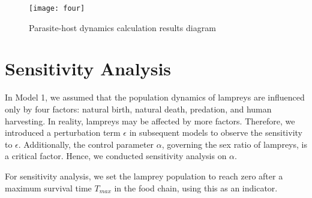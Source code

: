 \documentclass[CTeX = true]{mcmthesis}  %
\begin{document}
\begin{figure}[htbp]
       \centering    
   \texttt{[image: four]}
     \caption{Parasite-host dynamics calculation results diagram}
     \label{four}
\end{figure}

\section{Sensitivity Analysis}

In Model 1, we assumed that the population dynamics of lampreys are influenced only by four factors: natural birth, natural death, predation, and human harvesting. In reality, lampreys may be affected by more factors. Therefore, we introduced a perturbation term \(\epsilon\) in subsequent models to observe the sensitivity to \(\epsilon\). Additionally, the control parameter \(\alpha\), governing the sex ratio of lampreys, is a critical factor. Hence, we conducted sensitivity analysis on \(\alpha\).

For sensitivity analysis, we set the lamprey population to reach zero after a maximum survival time \(T_{max}\) in the food chain, using this as an indicator.

\begin{figure}[htbp]
      \centering
\end{figure}
      


\end{document}
